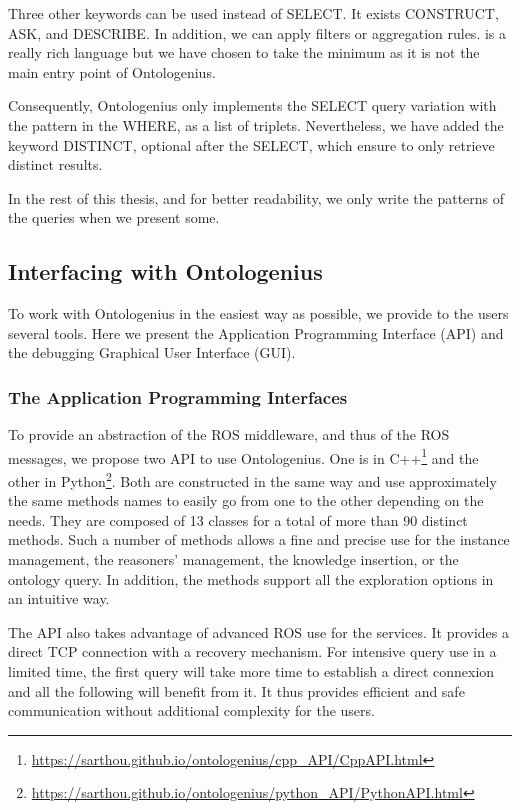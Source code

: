 Three other keywords can be used instead of SELECT. It exists CONSTRUCT, ASK, and DESCRIBE. In addition, we can apply filters or aggregation rules. \sparql{} is a really rich language but we have chosen to take the minimum as it is not the main entry point of Ontologenius.

Consequently, Ontologenius only implements the SELECT query variation with the pattern in the WHERE, as a list of triplets. Nevertheless, we have added the keyword DISTINCT, optional after the SELECT, which ensure to only retrieve distinct results.

In the rest of this thesis, and for better readability, we only write the patterns of the \sparql{} queries when we present some.

\subsection{Interfacing with Ontologenius}

To work with Ontologenius in the easiest way as possible, we provide to the users several tools. Here we present the Application Programming Interface (API) and the debugging Graphical User Interface (GUI).

\subsubsection{The Application Programming Interfaces}

To provide an abstraction of the ROS middleware, and thus of the ROS messages, we propose two API to use Ontologenius. One is in C++\footnote{\url{https://sarthou.github.io/ontologenius/cpp_API/CppAPI.html}} and the other in Python\footnote{\url{https://sarthou.github.io/ontologenius/python_API/PythonAPI.html}}. Both are constructed in the same way and use approximately the same methods names to easily go from one to the other depending on the needs. They are composed of 13 classes for a total of more than 90 distinct methods. Such a number of methods allows a fine and precise use for the instance management, the reasoners' management, the knowledge insertion, or the ontology query. In addition, the methods support all the exploration options in an intuitive way.

The API also takes advantage of advanced ROS use for the services. It provides a direct TCP connection with a recovery mechanism. For intensive query use in a limited time, the first query will take more time to establish a direct connexion and all the following will benefit from it. It thus provides efficient and safe communication without additional complexity for the users.


